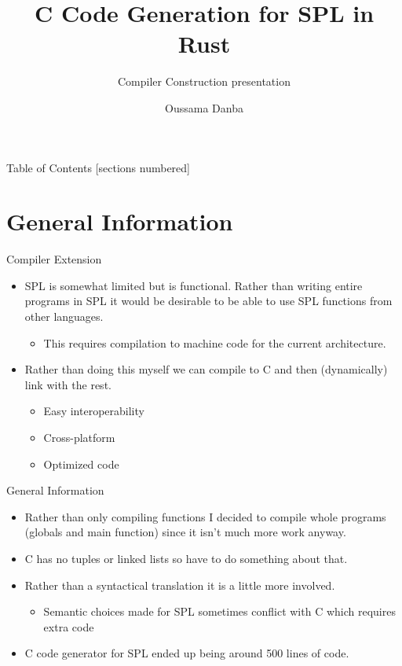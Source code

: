 \documentclass[10pt]{beamer}
\title{C Code Generation for SPL in Rust}
\subtitle{Compiler Construction presentation}
\date{}
\author{Oussama Danba}
\begin{document}
\maketitle

\begin{frame}{Table of Contents}
  [sections numbered]
  \tableofcontents[hideallsubsections]
\end{frame}

\section{General Information}
\begin{frame}{Compiler Extension}
    \begin{itemize}
        \item SPL is somewhat limited but is functional. Rather than writing entire programs in SPL it would be desirable to be able to use SPL functions from other languages.
        \begin{itemize}
            \item This requires compilation to machine code for the current architecture.
        \end{itemize}
        \item Rather than doing this myself we can compile to C and then (dynamically) link with the rest.
        \begin{itemize}
            \item Easy interoperability
            \item Cross-platform
            \item Optimized code
        \end{itemize}
    \end{itemize}
\end{frame}

\begin{frame}{General Information}
    \begin{itemize}
        \item Rather than only compiling functions I decided to compile whole programs (globals and main function) since it isn't much more work anyway.
        \item C has no tuples or linked lists so have to do something about that.
        \item Rather than a syntactical translation it is a little more involved.
        \begin{itemize}
            \item Semantic choices made for SPL sometimes conflict with C which requires extra code
        \end{itemize}
        \item C code generator for SPL ended up being around 500 lines of code.
    \end{itemize}
\end{frame}
\end{document}
